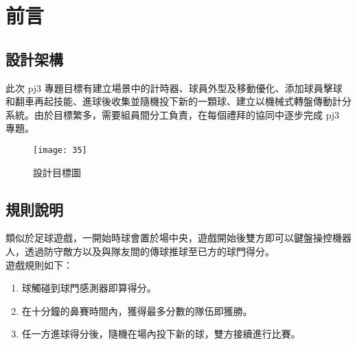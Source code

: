 \chapter{前言}
\renewcommand{\baselinestretch}{10.0} %
\setcounter{page}{1}  %
\fontsize{14pt}{2.5pt}\sectionef
\section{設計架構}
此次 pj3 專題目標有建立場景中的計時器、球員外型及移動優化、添加球員擊球和翻車再起技能、進球後收集並隨機投下新的一顆球、建立以機械式轉盤傳動計分系統。由於目標繁多，需要組員間分工負責，在每個禮拜的協同中逐步完成 pj3 專題。\\

\begin{figure}[hbt!]
\begin{center}
\texttt{[image: 35]}
\caption{\Large 設計目標圖}\label{fig.35}
\end{center}
\end{figure}
\section{規則說明}
類似於足球遊戲，一開始時球會置於場中央，遊戲開始後雙方即可以鍵盤操控機器人，透過防守敵方以及與隊友間的傳球推球至已方的球門得分。\\
遊戲規則如下：
\begin{enumerate}
\item 球觸碰到球門感測器即算得分。
\item 在十分鐘的鼻賽時間內，獲得最多分數的隊伍即獲勝。
\item 任一方進球得分後，隨機在場內投下新的球，雙方接續進行比賽。
\end{enumerate}

\renewcommand{\baselinestretch}{0.5} %